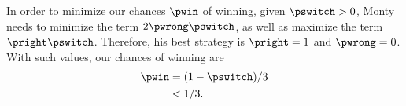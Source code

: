 In order to minimize our chances $\pwin$ of winning, given $\pswitch>0$, Monty needs to minimize the term $2\pwrong\pswitch$, as well as maximize the term $\pright\pswitch$.
Therefore, his best strategy is $\pright=1$ and $\pwrong=0$.
With such values, our chances of winning are
\begin{align*}
    \pwin &= (1-\pswitch)/3 \\
    &< 1/3.
\end{align*}
